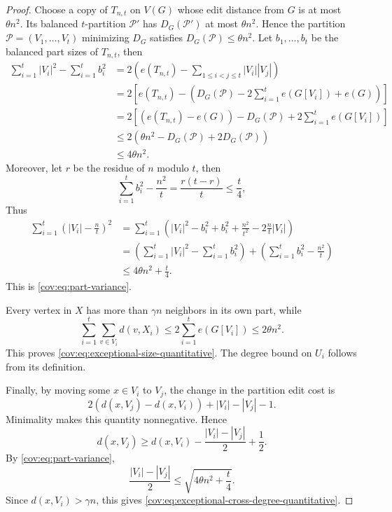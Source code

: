 \documentclass[11pt]{article}
\numberwithin{equation}{section}
\theoremstyle{remark}
\begin{document}
\begin{proof}
Choose a copy of \(T_{n,t}\) on \(V(G)\) whose edit distance from \(G\) is at most \(\theta n^2\).
Its balanced \(t\)-partition \(\mathcal P'\) has \(D_G(\mathcal P')\) at most \(\theta n^2\).
Hence the partition \(\mathcal P=(V_1,\ldots,V_t)\) minimizing \(D_G\) satisfies \(D_G(\mathcal P)\le\theta n^2\).
Let \(b_1,\ldots,b_t\) be the balanced part sizes of \(T_{n,t}\), then
\begin{equation*}
  \begin{aligned}
    \sum_{i=1}^t|V_i|^2-\sum_{i=1}^t b_i^2 &= 2\left(e(T_{n,t})-\sum_{1\le i<j\le t}|V_i||V_j|\right)\\
    &= 2\left[e(T_{n,t})-\left(D_G(\mathcal P)-2\sum_{i=1}^t e(G[V_i])+e(G)\right)\right]\\
    &= 2\left[\left(e(T_{n,t})-e(G)\right)-D_G(\mathcal P)+2\sum_{i=1}^t e(G[V_i])\right]\\
    &\le 2\left(\theta n^2-D_G(\mathcal P)+2D_G(\mathcal P)\right)\\
    &\le 4\theta n^2.
  \end{aligned}
\end{equation*}
Moreover, let \(r\) be the residue of \(n\) modulo \(t\), then
\begin{equation*}
\sum_{i=1}^t b_i^2-\frac{n^2}{t}
 =\frac{r(t-r)}{t}\le\frac t4,
\end{equation*}
Thus
\begin{equation*}
  \begin{aligned}
    \sum_{i=1}^t\left(|V_i|-\frac nt\right)^2 &= \sum_{i=1}^t\left(|V_i|^2-b_i^2+b_i^2+\frac{n^2}{t^2}-2\frac{n}{t}|V_i|\right)\\
    &= \left(\sum_{i=1}^t|V_i|^2-\sum_{i=1}^t b_i^2\right)+\left(\sum_{i=1}^t b_i^2-\frac{n^2}{t}\right)\\
    &\le 4\theta n^2+\frac{t}{4}.
  \end{aligned}
\end{equation*}
This is \eqref{cov:eq:part-variance}.

Every vertex in \(X\) has more than \(\gamma n\) neighbors in its own part, while
\begin{equation*}
\sum_{i=1}^t\sum_{v\in V_i}d(v,X_i)\le2\sum_{i=1}^t e(G[V_i])\le2\theta n^2.
\end{equation*}
This proves \eqref{cov:eq:exceptional-size-quantitative}.  The degree bound on \(U_i\) follows from its definition.

Finally, by moving some \(x\in V_i\) to \(V_j\), the change in the partition edit cost is
\begin{equation*}
2\left(d(x,V_j)-d(x,V_i)\right)+|V_i|-|V_j|-1.
\end{equation*}
Minimality makes this quantity nonnegative.  Hence
\begin{equation*}
d(x,V_j)
 \ge d(x,V_i)-\frac{|V_i|-|V_j|}{2}+\frac12.
\end{equation*}
By \eqref{cov:eq:part-variance},
\begin{equation*}
\frac{|V_i|-|V_j|}{2}
 \le \sqrt{4\theta n^2+\frac t4}.
\end{equation*}
Since \(d(x,V_i)>\gamma n\), this gives \eqref{cov:eq:exceptional-cross-degree-quantitative}.
\end{proof}
\end{document}
